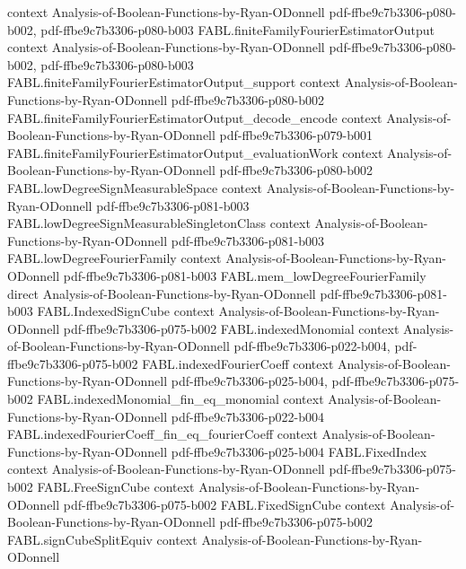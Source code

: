 \begin{theorem}
  {context}
  {Analysis-of-Boolean-Functions-by-Ryan-ODonnell}
  {pdf-ffbe9c7b3306-p080-b002,
    pdf-ffbe9c7b3306-p080-b003}
\proofstep
  {FABL.finiteFamilyFourierEstimatorOutput}
  {context}
  {Analysis-of-Boolean-Functions-by-Ryan-ODonnell}
  {pdf-ffbe9c7b3306-p080-b002,
    pdf-ffbe9c7b3306-p080-b003}
\proofstep
  {FABL.finiteFamilyFourierEstimatorOutput_support}
  {context}
  {Analysis-of-Boolean-Functions-by-Ryan-ODonnell}
  {pdf-ffbe9c7b3306-p080-b002}
\proofstep
  {FABL.finiteFamilyFourierEstimatorOutput_decode_encode}
  {context}
  {Analysis-of-Boolean-Functions-by-Ryan-ODonnell}
  {pdf-ffbe9c7b3306-p079-b001}
\proofstep
  {FABL.finiteFamilyFourierEstimatorOutput_evaluationWork}
  {context}
  {Analysis-of-Boolean-Functions-by-Ryan-ODonnell}
  {pdf-ffbe9c7b3306-p080-b002}
\proofstep
  {FABL.lowDegreeSignMeasurableSpace}
  {context}
  {Analysis-of-Boolean-Functions-by-Ryan-ODonnell}
  {pdf-ffbe9c7b3306-p081-b003}
\proofstep
  {FABL.lowDegreeSignMeasurableSingletonClass}
  {context}
  {Analysis-of-Boolean-Functions-by-Ryan-ODonnell}
  {pdf-ffbe9c7b3306-p081-b003}
\proofstep
  {FABL.lowDegreeFourierFamily}
  {context}
  {Analysis-of-Boolean-Functions-by-Ryan-ODonnell}
  {pdf-ffbe9c7b3306-p081-b003}
\proofstep
  {FABL.mem_lowDegreeFourierFamily}
  {direct}
  {Analysis-of-Boolean-Functions-by-Ryan-ODonnell}
  {pdf-ffbe9c7b3306-p081-b003}
\proofstep
  {FABL.IndexedSignCube}
  {context}
  {Analysis-of-Boolean-Functions-by-Ryan-ODonnell}
  {pdf-ffbe9c7b3306-p075-b002}
\proofstep
  {FABL.indexedMonomial}
  {context}
  {Analysis-of-Boolean-Functions-by-Ryan-ODonnell}
  {pdf-ffbe9c7b3306-p022-b004,
    pdf-ffbe9c7b3306-p075-b002}
\proofstep
  {FABL.indexedFourierCoeff}
  {context}
  {Analysis-of-Boolean-Functions-by-Ryan-ODonnell}
  {pdf-ffbe9c7b3306-p025-b004,
    pdf-ffbe9c7b3306-p075-b002}
\proofstep
  {FABL.indexedMonomial_fin_eq_monomial}
  {context}
  {Analysis-of-Boolean-Functions-by-Ryan-ODonnell}
  {pdf-ffbe9c7b3306-p022-b004}
\proofstep
  {FABL.indexedFourierCoeff_fin_eq_fourierCoeff}
  {context}
  {Analysis-of-Boolean-Functions-by-Ryan-ODonnell}
  {pdf-ffbe9c7b3306-p025-b004}
\proofstep
  {FABL.FixedIndex}
  {context}
  {Analysis-of-Boolean-Functions-by-Ryan-ODonnell}
  {pdf-ffbe9c7b3306-p075-b002}
\proofstep
  {FABL.FreeSignCube}
  {context}
  {Analysis-of-Boolean-Functions-by-Ryan-ODonnell}
  {pdf-ffbe9c7b3306-p075-b002}
\proofstep
  {FABL.FixedSignCube}
  {context}
  {Analysis-of-Boolean-Functions-by-Ryan-ODonnell}
  {pdf-ffbe9c7b3306-p075-b002}
\proofstep
  {FABL.signCubeSplitEquiv}
  {context}
  {Analysis-of-Boolean-Functions-by-Ryan-ODonnell}

\end{theorem}
